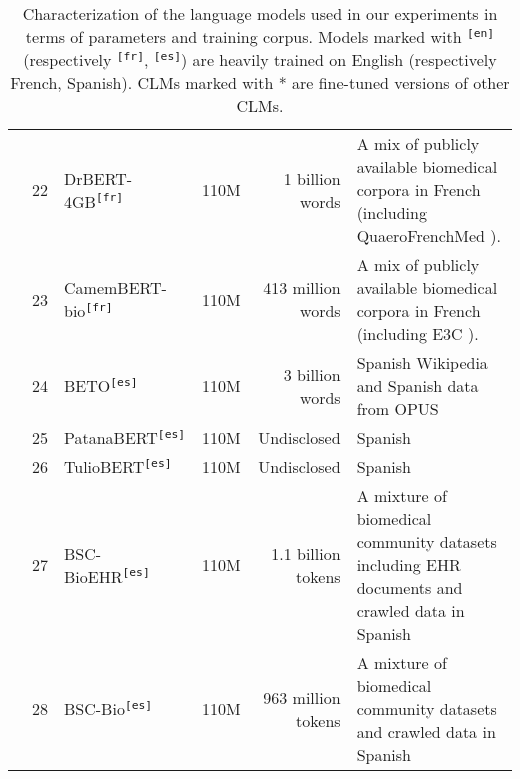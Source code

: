 \begin{table}[ht]
{\begin{tabular}{cllrrl}
 & 22 & DrBERT-4GB\textsuperscript{\texttt{[fr]}} \cite{labrak2023drbert} & 110M & 1 billion words & A mix of publicly available biomedical corpora in French (including QuaeroFrenchMed \cite{neveol2014quaero}). \\
 & 23 & CamemBERT-bio\textsuperscript{\texttt{[fr]}} \cite{touchent2023camembertbio} & 110M & 413 million words & A mix of publicly available biomedical corpora in French (including E3C \cite{magnini2021e3c}). \\
 & 24 & BETO\textsuperscript{\texttt{[es]}} \cite{canete2020beto} & 110M & 3 billion words & Spanish Wikipedia and Spanish data from OPUS \cite{tiedemann2012parallel} \\
 & 25 & PatanaBERT\textsuperscript{\texttt{[es]}} & 110M & Undisclosed & Spanish \\
 & 26 & TulioBERT\textsuperscript{\texttt{[es]}} & 110M & Undisclosed & Spanish \\
 & 27 & BSC-BioEHR\textsuperscript{\texttt{[es]}} \cite{carrino2022pretrained} & 110M & 1.1 billion tokens & A mixture of biomedical community datasets including EHR documents and crawled data in Spanish \\
 & 28 & BSC-Bio\textsuperscript{\texttt{[es]}} \cite{carrino2022pretrained} & 110M & 963 million tokens & A mixture of biomedical community datasets and crawled data in Spanish \\
\bottomrule
\end{tabular}}
\caption{Characterization of the language models used in our experiments in terms of parameters and training corpus. Models marked with \textsuperscript{\texttt{[en]}} (respectively \textsuperscript{\texttt{[fr]}}, \textsuperscript{\texttt{[es]}}) are heavily trained on English (respectively French, Spanish). CLMs marked with * are fine-tuned versions of other CLMs.}
\label{tab:LM_features}
\end{table}
